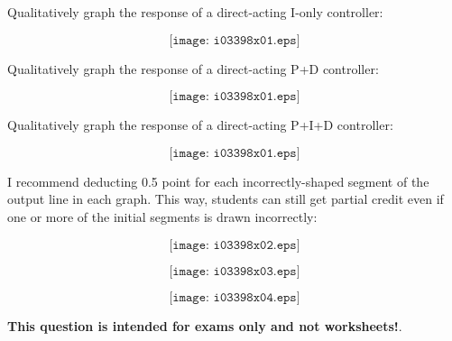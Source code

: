 

Qualitatively graph the response of a direct-acting I-only controller:

$$\texttt{[image: i03398x01.eps]}$$

Qualitatively graph the response of a direct-acting P+D controller:

$$\texttt{[image: i03398x01.eps]}$$

Qualitatively graph the response of a direct-acting P+I+D controller:

$$\texttt{[image: i03398x01.eps]}$$







I recommend deducting 0.5 point for each incorrectly-shaped segment of the output line in each graph.  This way, students can still get partial credit even if one or more of the initial segments is drawn incorrectly:

$$\texttt{[image: i03398x02.eps]}$$

$$\texttt{[image: i03398x03.eps]}$$

$$\texttt{[image: i03398x04.eps]}$$







{\bf This question is intended for exams only and not worksheets!}.



